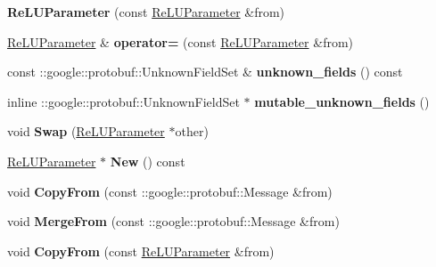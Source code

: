 \begin{DoxyCompactItemize}
{\bfseries Re\+L\+U\+Parameter} (const \mbox{\hyperlink{classcaffe_1_1_re_l_u_parameter}{Re\+L\+U\+Parameter}} \&from)
\item 
\mbox{\label{classcaffe_1_1_re_l_u_parameter_adc18e3d60acea61907ee3c181c6fc411}} 
\mbox{\hyperlink{classcaffe_1_1_re_l_u_parameter}{Re\+L\+U\+Parameter}} \& {\bfseries operator=} (const \mbox{\hyperlink{classcaffe_1_1_re_l_u_parameter}{Re\+L\+U\+Parameter}} \&from)
\item 
\mbox{\label{classcaffe_1_1_re_l_u_parameter_acefbf338d0a705087f0a5dc3760e6c1d}} 
const \+::google\+::protobuf\+::\+Unknown\+Field\+Set \& {\bfseries unknown\+\_\+fields} () const
\item 
\mbox{\label{classcaffe_1_1_re_l_u_parameter_a526f167173aa6fe3a620d1e3785d5545}} 
inline \+::google\+::protobuf\+::\+Unknown\+Field\+Set $\ast$ {\bfseries mutable\+\_\+unknown\+\_\+fields} ()
\item 
\mbox{\label{classcaffe_1_1_re_l_u_parameter_a082d095781dff614892aed2a0e9e2d29}} 
void {\bfseries Swap} (\mbox{\hyperlink{classcaffe_1_1_re_l_u_parameter}{Re\+L\+U\+Parameter}} $\ast$other)
\item 
\mbox{\label{classcaffe_1_1_re_l_u_parameter_a124a0ab2256c9df3159c0d56bb255138}} 
\mbox{\hyperlink{classcaffe_1_1_re_l_u_parameter}{Re\+L\+U\+Parameter}} $\ast$ {\bfseries New} () const
\item 
\mbox{\label{classcaffe_1_1_re_l_u_parameter_aaedc5dfab2e20fe0e8631fd1340c6953}} 
void {\bfseries Copy\+From} (const \+::google\+::protobuf\+::\+Message \&from)
\item 
\mbox{\label{classcaffe_1_1_re_l_u_parameter_a49ebd660d9078b308a4b98eea7e0ec86}} 
void {\bfseries Merge\+From} (const \+::google\+::protobuf\+::\+Message \&from)
\item 
\mbox{\label{classcaffe_1_1_re_l_u_parameter_ad5ee51a8a540122f81fad7afc2cbf27b}} 
void {\bfseries Copy\+From} (const \mbox{\hyperlink{classcaffe_1_1_re_l_u_parameter}{Re\+L\+U\+Parameter}} \&from)

\end{DoxyCompactItemize}
